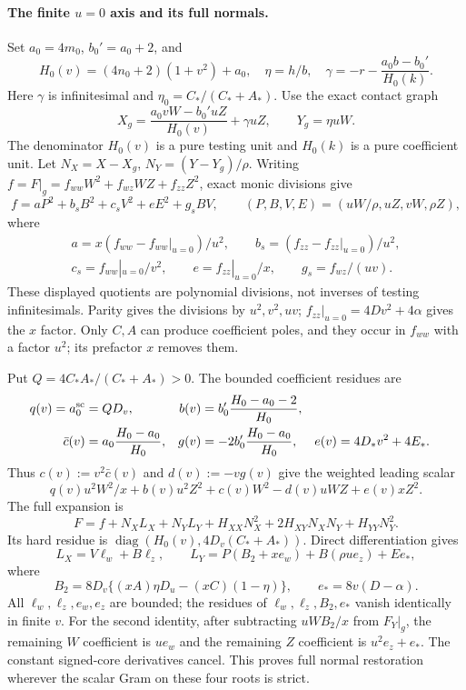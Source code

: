 \paragraph{The finite $u=0$ axis and its full normals.}
Set $a_0=4m_0$, $b_0'=a_0+2$, and
\[
 H_0(v)=(4n_0+2)(1+v^2)+a_0,\quad \eta=h/b,
 \quad \gamma=-r-\frac{a_0b-b_0'}{H_0(k)}.
\]
Here $\gamma$ is infinitesimal and $\eta_0=C_* /(C_*+A_*)$.
Use the exact contact graph
\[
 X_g=\frac{a_0vW-b_0'uZ}{H_0(v)}+\gamma uZ,
 \qquad Y_g=\eta uW.
\]
The denominator $H_0(v)$ is a pure testing unit and $H_0(k)$ is a
pure coefficient unit.  Let $N_X=X-X_g$, $N_Y=(Y-Y_g)/\rho$.
Writing $f=F|_g=f_{ww}W^2+f_{wz}WZ+f_{zz}Z^2$, exact monic divisions give
\[
 f=aP^2+b_s B^2+c_s V^2+eE^2+g_sBV,
 \qquad(P,B,V,E)=(uW/\rho,uZ,vW,\rho Z),
\]
where
\[
 \begin{gathered}
 a=x(f_{ww}-f_{ww}|_{u=0})/u^2,\qquad
 b_s=(f_{zz}-f_{zz}|_{u=0})/u^2,\\
 c_s=f_{ww}|_{u=0}/v^2,\qquad e=f_{zz}|_{u=0}/x,\qquad
 g_s=f_{wz}/(uv).
 \end{gathered}
\]
These displayed quotients are polynomial divisions, not inverses of
testing infinitesimals.  Parity gives the divisions by $u^2,v^2,uv$;
$f_{zz}|_{u=0}=4Dv^2+4\alpha$ gives the $x$ factor.  Only $C,A$ can
produce coefficient poles, and they occur in $f_{ww}$ with a factor
$u^2$; its prefactor $x$ removes them.

Put $Q=4C_*A_* /(C_*+A_*)>0$.  The bounded coefficient residues are
\begin{align*}
 q(v)=a_0^{\rm sc}&=Q D_v,&
 b(v)&=b_0'\frac{H_0-a_0-2}{H_0},\\
 \bar c(v)&=a_0\frac{H_0-a_0}{H_0},&
 g(v)&=-2b_0'\frac{H_0-a_0}{H_0},&
 e(v)&=4D_*v^2+4E_*.
\end{align*}
Thus $c(v):=v^2\bar c(v)$ and $d(v):=-vg(v)$ give the weighted
leading scalar
\[
 q(v)u^2W^2/x+b(v)u^2Z^2+c(v)W^2-d(v)uWZ+e(v)xZ^2.
\]
The full expansion is
\[
 F=f+N_XL_X+N_YL_Y+H_{XX}N_X^2+2H_{XY}N_XN_Y+H_{YY}N_Y^2.
\]
Its hard residue is $\operatorname{diag}(H_0(v),4D_v(C_*+A_*))$.
Direct differentiation gives
\[
 L_X=V\ell_w+B\ell_z,\qquad
 L_Y=P(B_2+xe_w)+B(\rho u e_z)+E e_*,
\]
where
\[
 B_2=8D_v\{(xA)\eta D_u-(xC)(1-\eta)\},\qquad
 e_*=8v(D-\alpha).
\]
All $\ell_w,\ell_z,e_w,e_z$ are bounded; the residues of
$\ell_w,\ell_z,B_2,e_*$ vanish identically in finite $v$.
For the second identity, after subtracting $uWB_2/x$ from $F_Y|_g$,
the remaining $W$ coefficient is $ue_w$ and the remaining $Z$
coefficient is $u^2e_z+e_*$.  The constant signed-core derivatives
cancel.  This proves full normal restoration wherever the scalar
Gram on these four roots is strict.

